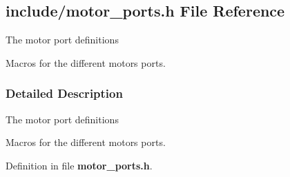 \subsection{include/motor\+\_\+ports.h File Reference}
\label{motor__ports_8h}


The motor port definitions

Macros for the different motors ports.  




\subsubsection{Detailed Description}
The motor port definitions

Macros for the different motors ports. 



Definition in file \textbf{ motor\+\_\+ports.\+h}.


